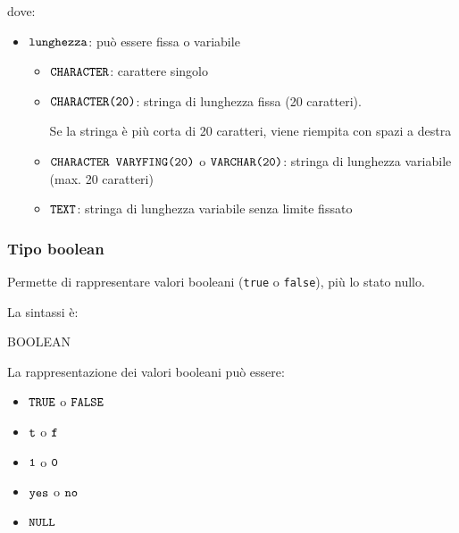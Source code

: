 dove:
\begin{itemize}[label=$\triangleright$]
  \item $\verb|lunghezza|$: può essere fissa o variabile
  \begin{itemize}[label=$\diamond$, itemsep=\medskipamount]
    \item $\verb|CHARACTER|$: carattere singolo
    \item $\verb|CHARACTER(20)|$: stringa di lunghezza fissa (20 caratteri).
    
    Se la stringa è più corta di 20 caratteri, viene riempita con spazi a destra
    \item $\verb|CHARACTER VARYFING(20)|$ o $\verb|VARCHAR(20)|$: stringa di lunghezza variabile (max. 20 caratteri)
    \item $\verb|TEXT|$: stringa di lunghezza variabile senza limite fissato
  \end{itemize}
\end{itemize}

\subsubsection{Tipo boolean}
Permette di rappresentare valori booleani (\texttt{true} o \texttt{false}), più lo stato nullo.

La sintassi è:
\begin{codiceSQL}
BOOLEAN
\end{codiceSQL}

La rappresentazione dei valori booleani può essere:
\begin{itemize}[label=$\circ$, itemsep=\smallskipamount]
  \item $\verb|TRUE|$ o $\verb|FALSE|$
  \item $\verb|t|$ o $\verb|f|$
  \item $\verb|1|$ o $\verb|0|$
  \item $\verb|yes|$ o $\verb|no|$
  \item $\verb|NULL|$
\end{itemize}

